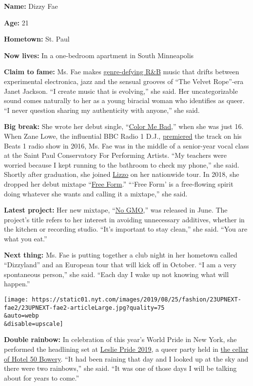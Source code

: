 \textbf{Name:} Dizzy Fae

\textbf{Age:} 21

\textbf{Hometown:} St. Paul

\textbf{Now lives:} In a one-bedroom apartment in South Minneapolis

\textbf{Claim to fame:} Ms. Fae makes
\href{https://soundcloud.com/dizzy-fae}{genre-defying R\&B} music that
drifts between experimental electronica, jazz and the sensual grooves of
``The Velvet Rope''-era Janet Jackson. ``I create music that is
evolving,'' she said. Her uncategorizable sound comes naturally to her
as a young biracial woman who identifies as queer. ``I never question
sharing my authenticity with anyone,'' she said.

\textbf{Big break:} She wrote her debut single,
``\href{https://soundcloud.com/dizzy-fae/color-me-bad}{Color Me Bad},''
when she was just 16. When Zane Lowe, the influential BBC Radio 1 D.J.,
\href{https://twitter.com/dizzyfae/status/717788243094216705}{premiered}
the track on his Beats 1 radio show in 2016, Ms. Fae was in the middle
of a senior-year vocal class at the Saint Paul Conservatory For
Performing Artists. ``My teachers were worried because I kept running to
the bathroom to check my phone,'' she said. Shortly after graduation,
she joined
\href{https://www.nytimes.com/2018/09/18/style/lizzo-truth-hurts.html}{Lizzo}
on her nationwide tour. In 2018, she dropped her debut mixtape
``\href{https://soundcloud.com/dizzy-fae/sets/dizzy-fae-free-form-mixtape}{Free
Form}.'' ```Free Form' is a free-flowing spirit doing whatever she wants
and calling it a mixtape,'' she said.

\textbf{Latest project:} Her new mixtape,
``\href{https://soundcloud.com/dizzy-fae/sets/no-gmo-mixtape-1}{No
GMO},'' was released in June. The project's title refers to her interest
in avoiding unnecessary additives, whether in the kitchen or recording
studio. ``It's important to stay clean,'' she said. ``You are what you
eat.''

\textbf{Next thing:} Ms. Fae is putting together a club night in her
hometown called ``Dizzyland'' and an European tour that will kick off in
October. ``I am a very spontaneous person,'' she said. ``Each day I wake
up not knowing what will happen.''

\texttt{[image: https://static01.nyt.com/images/2019/08/25/fashion/23UPNEXT-fae2/23UPNEXT-fae2-articleLarge.jpg?quality=75\\\&auto=webp\\\&disable=upscale]}

\textbf{Double rainbow:} In celebration of this year's World Pride in
New York, she performed the headlining set at
\href{https://outbuzz.com/gay-parties/leslie-pride-2019/}{Leslie Pride
2019}, a queer party held in \href{https://www.conceptny.com}{the cellar
of Hotel 50 Bowery}. ``It had been raining that day and I looked up at
the sky and there were two rainbows,'' she said. ``It was one of those
days I will be talking about for years to come.''

